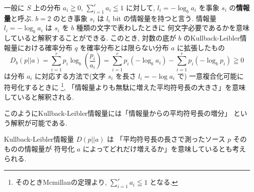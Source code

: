 \documentclass[12pt,twoside]{jarticle}
\theoremstyle{jplain}
\theoremstyle{jplain}
\theoremstyle{jplain}
\numberwithin{theorem}{section}
\numberwithin{equation}{section}
\numberwithin{figure}{section}
\numberwithin{table}{section}
\begin{document}
一般に $S$ 上の分布 $a_i\geqq 0$, $\sum_{i=1}^r a_i\leqq 1$ に対して, 
$l_i=-\log_b a_i$ を事象 $s_i$ の{\bf 情報量}と呼ぶ.
$b=2$ のとき事象 $s_i$ は $l_i$ bit の情報量を持つと言う.
情報量 $l_i=-\log_b a_i$ は $s_i$ を $b$ 種類の文字で表わしたときに
何文字必要であるかを意味していると解釈することができる.
このとき, 対数の底が $b$ のKullback-Leibler情報量における確率分布 $q$ 
を確率分布とは限らない分布 $a$ に拡張したもの
\[
D_b(p||a)
=\sum_{i=1}^r p_i\log_b\left(\frac{p_i}{a_i}\right)
=\sum_{i=1}^r p_i(-\log_b a_i) - \sum_{i=1}^r p_i(-\log_b p_i)
\geqq 0
\]
は分布 $a_i$ に対応する方法で(文字 $s_i$ を長さ $l_i=-\log a_i$ で)
一意複合化可能に符号化するときに%
\footnote{そのときMcmillanの定理より, $\sum_{i=1}^r a_i\leqq 1$ となる.}, 
「情報量よりも無駄に増えた平均符号長の大きさ」を意味していると解釈される.

このようにKullback-Leibler情報量には「情報量からの平均符号長の増分」
という解釈が可能である.

Kullback-Leibler情報量 $D(p||a)$ は
「平均符号長の長さで測ったソース $p$ そのものの情報量が
符号化 $a$ によってどれだけ増えるか」を意味しているとも考えられる.


\end{document}
